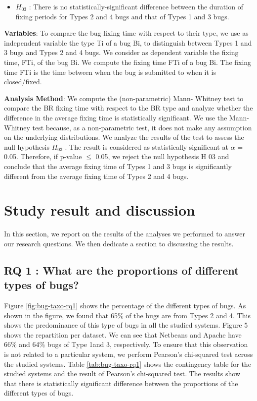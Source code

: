 \begin{itemize}
	\item $H_{03}$ : There is no statistically-significant difference
between the duration of fixing periods for Types 2 and
4 bugs and that of Types 1 and 3 bugs.
\end{itemize}


{\bf Variables}: To compare the bug fixing time with respect to
their type, we use as independent variable the type Ti of a
bug Bi, to distinguish between Types 1 and 3 bugs and Types
2 and 4 bugs. We consider as dependent variable the fixing
time, FTi, of the bug Bi. We compute the fixing time FTi of a
bug Bi. The fixing time FTi is the time between when the bug
is submitted to when it is closed/fixed.

{\bf Analysis Method}: We compute the (non-parametric) Mann-
Whitney test to compare the BR fixing time with respect to
the BR type and analyze whether the difference in the average
fixing time is statistically significant. We use the Mann-
Whitney test because, as a non-parametric test, it does not
make any assumption on the underlying distributions. We
analyze the results of the test to assess the null hypothesis
$H_{03}$ . The result is considered as statistically significant at $\alpha$ =
0.05. Therefore, if p-value $\le$ 0.05, we reject the null
hypothesis H 03 and conclude that the average fixing time of
Types 1 and 3 bugs is significantly different from the average
fixing time of Types 2 and 4 bugs.

\section{Study result and discussion}

In this section, we report on the results of the analyses we
performed to answer our research questions. We then dedicate
a section to discussing the results.

\subsection{RQ 1 : What are the proportions of different types of
bugs?}

Figure \ref{fig:bug-taxo-rq1} shows the percentage of the different types of
bugs. As shown in the figure, we found that 65\% of the bugs
are from Types 2 and 4. This shows the predominance of this
type of bugs in all the studied systems. Figure 5 shows the
repartition per dataset. We can see that Netbeans and Apache
have 66\% and 64\% bugs of Type 1and 3, respectively. To
ensure that this observation is not related to a particular
system, we perform Pearson’s chi-squared test across the
studied systems. Table \ref{tab:bug-taxo-rq1} shows the contingency table for the
studied systems and the result of Pearson’s chi-squared test.
The results show that there is statistically significant
difference between the proportions of the different types of
bugs.


